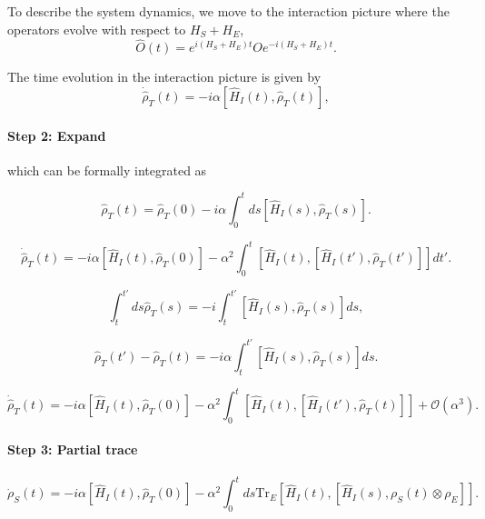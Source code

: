 To describe the system dynamics, we move to the interaction picture where the operators evolve with respect to $H_S + H_E$,
\begin{equation}
    \hat{O}(t) = e^{i(H_S+H_E)t} O e^{-i(H_S+H_E)t}.
\end{equation}

The time evolution in the interaction picture is given by
\begin{equation}
    \dot{\hat{\rho}}_T(t) = -i \alpha [\hat{H}_I(t), \hat{\rho}_T(t)],
\end{equation}

\paragraph{Step 2: Expand}
which can be formally integrated as

\begin{equation}
    \hat{\rho}_T(t) = \hat{\rho}_T(0) - i \alpha \int_0^t ds [\hat{H}_I(s), \hat{\rho}_T(s)].
\end{equation}

\begin{equation}
    \dot{\hat{\rho}}_T(t) = -i \alpha \left[ \hat{H}_I(t), \hat{\rho}_T(0) \right] - \alpha^2 \int_0^t \left[ \hat{H}_I(t), \left[ \hat{H}_I(t'), \hat{\rho}_T(t') \right] \right] dt'.
\end{equation}

\begin{equation}
    \int_t^{t'} d s \hat{\rho}_T(s) = -i \int_t^{t'} \left[ \hat{H}_I(s), \hat{\rho}_T(s) \right] ds,
\end{equation}

\begin{equation}
    \hat{\rho}_T(t') - \hat{\rho}_T(t) = -i \alpha \int_t^{t'} \left[ \hat{H}_I(s), \hat{\rho}_T(s) \right] ds.
\end{equation}

\begin{equation}
    \dot{\hat{\rho}}_T(t) = -i \alpha \left[ \hat{H}_I(t), \hat{\rho}_T(0) \right] 
    - \alpha^2 \int_0^t \left[ \hat{H}_I(t), \left[ \hat{H}_I(t'), \hat{\rho}_T(t) \right] \right] + \mathcal{O} (\alpha^3).
\end{equation}

\paragraph{Step 3: Partial trace}

\begin{equation}
    \dot{\rho}_S(t) = -i \alpha [\hat{H}_I(t),\hat{\rho}_T(0)]  - \alpha^2 \int_0^t ds \mathrm{Tr}_E [\hat{H}_I(t), [\hat{H}_I(s), \rho_S(t) \otimes \rho_E]].
\end{equation}

